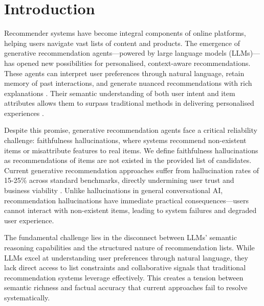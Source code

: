 \documentclass[acmsmall]{acmart}
\begin{document}

\section{Introduction}

Recommender systems have become integral components of online platforms, helping users navigate vast lists of content and products. The emergence of generative recommendation agents—powered by large language models (LLMs)—has opened new possibilities for personalised, context-aware recommendations. These agents can interpret user preferences through natural language, retain memory of past interactions, and generate nuanced recommendations with rich explanations \cite{park2024llm, kang2023conversationalrec}. Their semantic understanding of both user intent and item attributes allows them to surpass traditional methods in delivering personalised experiences \cite{baltrunas2015frappe}.

Despite this promise, generative recommendation agents face a critical reliability challenge: faithfulness hallucinations, where systems recommend non-existent items or misattribute features to real items. We define faithfulness hallucinations as recommendations of items are not existed in the provided list of candidates. Current generative recommendation approaches suffer from hallucination rates of 15-25\% across standard benchmarks, directly undermining user trust and business viability \cite{thompson2024user}. Unlike hallucinations in general conversational AI, recommendation hallucinations have immediate practical consequences—users cannot interact with non-existent items, leading to system failures and degraded user experience.

The fundamental challenge lies in the disconnect between LLMs' semantic reasoning capabilities and the structured nature of recommendation lists. While LLMs excel at understanding user preferences through natural language, they lack direct access to list constraints and collaborative signals that traditional recommendation systems leverage effectively. This creates a tension between semantic richness and factual accuracy that current approaches fail to resolve systematically.
\end{document}
